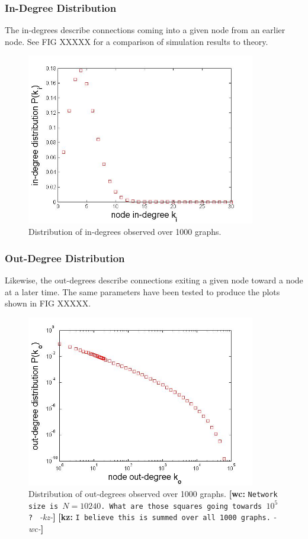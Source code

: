 \documentclass[preprint,notitlepage,amsmath,amssymb,floatfix]{revtex4-1}
\newcommand{\XXX}[3]{{\bf [#1: } {\tt #3} {\it -#2-}{\bf ]}}
\begin{document}
\subsubsection{In-Degree Distribution}
The in-degrees describe connections coming into a given node from an earlier node.
See FIG XXXXX for a comparison of simulation results to theory.














\begin{figure}
\includegraphics[width=10cm]{figures/in_degree_universe.jpg}
\caption{Distribution of in-degrees observed over 1000 graphs.}
\label{fig:in_deg_uni}
\centering
\end{figure}

\subsubsection{Out-Degree Distribution}
Likewise, the out-degrees describe connections exiting a given node toward a node at a later time.  The same parameters have been tested to produce the plots shown in FIG XXXXX.

\begin{figure}
\includegraphics[width=10cm]{figures/out_degree_universe.jpg}
\caption{Distribution of out-degrees observed over 1000 graphs. \XXX{wc}{kz}{Network size is $N=10240$. What are those squares going towards $10^5$? } \XXX{kz}{wc}{I believe this is summed over all 1000 graphs.}}
\label{fig:out_deg_uni}
\centering
\end{figure}
\end{document}
